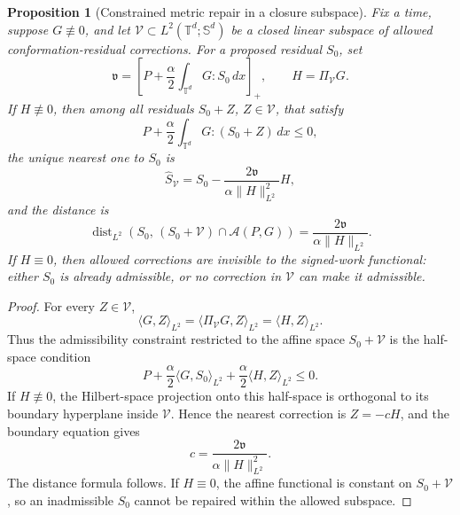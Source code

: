 \documentclass[11pt]{article}
\numberwithin{equation}{section}
\newtheorem{proposition}[theorem]{Proposition}
\newcommand{\T}{\mathbb T}
\newcommand{\Sym}{\mathbb S}
\newcommand{\calA}{\mathcal A}
\begin{document}
\begin{proposition}[Constrained metric repair in a closure subspace]
\label{prop:subspace-repair}
Fix a time, suppose \(G\not\equiv0\), and let
\(\mathcal V\subset L^2(\T^d;\Sym^d)\) be a closed linear subspace of allowed
conformation-residual corrections.  For a proposed residual \(S_0\), set
\[
  \mathfrak v
  =
  \left[P+\frac{\alpha}{2}\int_{\T^d}G:S_0\,dx\right]_+,
  \qquad
  H=\Pi_{\mathcal V}G .
\]
If \(H\not\equiv0\), then among all residuals \(S_0+Z\), \(Z\in\mathcal V\),
that satisfy
\[
  P+\frac{\alpha}{2}\int_{\T^d}G:(S_0+Z)\,dx\le0,
\]
the unique nearest one to \(S_0\) is
\[
  \widehat S_{\mathcal V}
  =
  S_0-
  \frac{2\mathfrak v}{\alpha\|H\|_{L^2}^2}H,
\]
and the distance is
\[
  \operatorname{dist}_{L^2}
  \left(S_0,\,(S_0+\mathcal V)\cap\calA(P,G)\right)
  =
  \frac{2\mathfrak v}{\alpha\|H\|_{L^2}}.
\]
If \(H\equiv0\), then allowed corrections are invisible to the signed-work
functional: either \(S_0\) is already admissible, or no correction in
\(\mathcal V\) can make it admissible.
\end{proposition}

\begin{proof}
For every \(Z\in\mathcal V\),
\[
  \langle G,Z\rangle_{L^2}=\langle \Pi_{\mathcal V}G,Z\rangle_{L^2}
  =\langle H,Z\rangle_{L^2}.
\]
Thus the admissibility constraint restricted to the affine space
\(S_0+\mathcal V\) is the half-space condition
\[
  P+\frac{\alpha}{2}\langle G,S_0\rangle_{L^2}
  +\frac{\alpha}{2}\langle H,Z\rangle_{L^2}
  \le0.
\]
If \(H\not\equiv0\), the Hilbert-space projection onto this half-space is
orthogonal to its boundary hyperplane inside \(\mathcal V\).  Hence the nearest
correction is \(Z=-cH\), and the boundary equation gives
\[
  c=\frac{2\mathfrak v}{\alpha\|H\|_{L^2}^2}.
\]
The distance formula follows.  If \(H\equiv0\), the affine functional is constant
on \(S_0+\mathcal V\), so an inadmissible \(S_0\) cannot be repaired within the
allowed subspace.
\end{proof}
\end{document}
